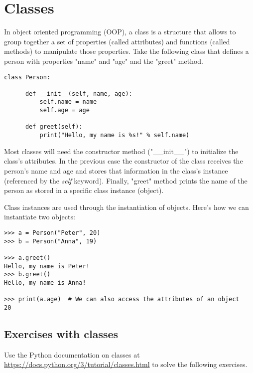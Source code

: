 \chapter{Classes}\label{classes}

In object oriented programming (OOP), a class is a structure that allows to group together a set of properties (called attributes) and functions (called methods) to manipulate those properties. Take the following class that defines a person with properties "name" and "age" and the "greet" method.

\begin{lstlisting}
class Person:

      def __init__(self, name, age):
          self.name = name
          self.age = age
          
      def greet(self):
          print("Hello, my name is %s!" % self.name)
\end{lstlisting}

Most classes will need the constructor method ("\_\_init\_\_") to initialize the class's attributes. In the previous case the constructor of the class receives the person's name and age and stores that information in the class's instance (referenced by the \textit{self} keyword). Finally, "greet" method prints the name of the person as stored in a specific class instance (object).

Class instances are used through the instantiation of objects. Here's how we can instantiate two objects:

\begin{lstlisting}
>>> a = Person("Peter", 20)
>>> b = Person("Anna", 19)

>>> a.greet()
Hello, my name is Peter!
>>> b.greet()
Hello, my name is Anna!
  
>>> print(a.age)  # We can also access the attributes of an object
20
\end{lstlisting}

\section{Exercises with classes}

Use the Python documentation on classes at \url{https://docs.python.org/3/tutorial/classes.html} to solve the following exercises.

